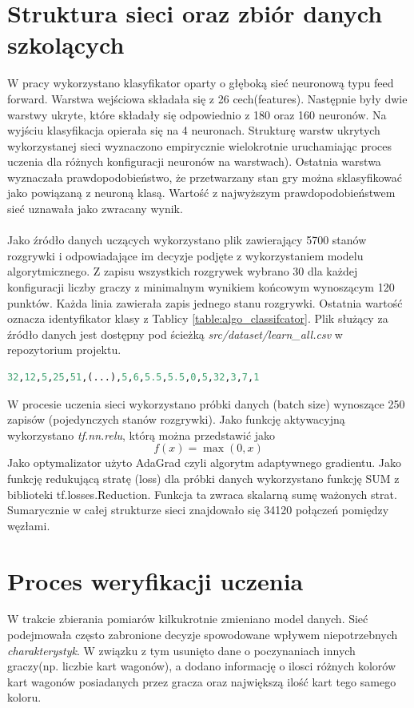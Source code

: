 \documentclass[12pt, oneside]{report}
\begin{document}
\section{Struktura sieci oraz zbiór danych szkolących}
W pracy wykorzystano klasyfikator oparty o głęboką sieć neuronową typu feed forward. Warstwa wejściowa składała się z 26 cech(features). Następnie były dwie warstwy ukryte, które składały się odpowiednio z 180 oraz 160 neuronów. Na wyjściu klasyfikacja opierała się na 4 neuronach. Strukturę warstw ukrytych wykorzystanej sieci wyznaczono empirycznie wielokrotnie uruchamiając proces uczenia dla różnych konfiguracji neuronów na warstwach). Ostatnia warstwa wyznaczała prawdopodobieństwo, że przetwarzany stan gry można sklasyfikować jako powiązaną z neuroną klasą. Wartość z najwyższym prawdopodobieństwem sieć uznawała jako zwracany wynik.
 \\ \\ 
Jako źródło danych uczących wykorzystano plik zawierający 5700 stanów rozgrywki i odpowiadające im decyzje podjęte z wykorzystaniem modelu algorytmicznego. Z zapisu wszystkich rozgrywek wybrano 30 dla każdej konfiguracji liczby graczy z minimalnym wynikiem końcowym wynoszącym 120 punktów. Każda linia zawierała zapis jednego stanu rozgrywki. Ostatnia wartość oznacza identyfikator klasy z Tablicy \ref{table:algo_classifcator}. Plik służący za źródło danych jest dostępny pod ścieżką \textit{src/dataset/learn\_all.csv} w repozytorium projektu. 
\begin{lstlisting}[frame=single, language=Python, caption=Pojedynczy format danych uczacych]
32,12,5,25,51,(...),5,6,5.5,5.5,0,5,32,3,7,1
\end{lstlisting}

W procesie uczenia sieci wykorzystano próbki danych (batch size) wynoszące 250 zapisów (pojedynczych stanów rozgrywki). Jako funkcję aktywacyjną wykorzystano \textit{tf.nn.relu}, którą można przedstawić jako 
\begin{equation}
	f(x) = \max (0,x)
	\label{eq:relu}
\end{equation}
Jako optymalizator użyto AdaGrad czyli algorytm adaptywnego gradientu. Jako funkcję redukującą stratę (loss) dla próbki danych wykorzystano funkcję SUM z biblioteki tf.losses.Reduction. Funkcja ta zwraca skalarną sumę ważonych strat. Sumarycznie w całej strukturze sieci znajdowało się 34120 połączeń pomiędzy węzłami.
\section{Proces weryfikacji uczenia}
W trakcie zbierania pomiarów kilkukrotnie zmieniano model danych. Sieć podejmowała często zabronione decyzje spowodowane wpływem niepotrzebnych \textit{charakterystyk}. W związku z tym usunięto dane o poczynaniach innych graczy(np. liczbie kart wagonów), a dodano informację o ilosci różnych kolorów kart wagonów posiadanych przez gracza oraz największą ilość kart tego samego koloru.
\end{document}

